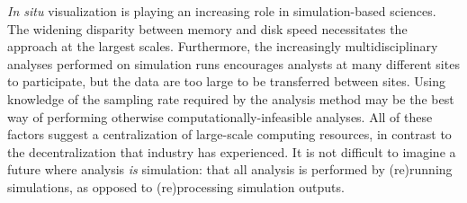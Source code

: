 

\textit{In situ} visualization is playing an increasing role
in simulation-based sciences.  The widening disparity between
memory and disk speed necessitates the approach at the largest
scales.  Furthermore, the increasingly multidisciplinary analyses
performed on simulation runs encourages analysts at many different
sites to participate, but the data are too large to be transferred
between sites.  Using knowledge of the sampling rate required by
the analysis method may be the best way of performing otherwise
computationally-infeasible analyses.  All of these factors suggest a
centralization of large-scale computing resources, in contrast to the
decentralization that industry has experienced.  It is not difficult to
imagine a future where analysis
\emph{is} simulation: that all analysis is performed by (re)running
simulations, as opposed to (re)processing simulation outputs.


